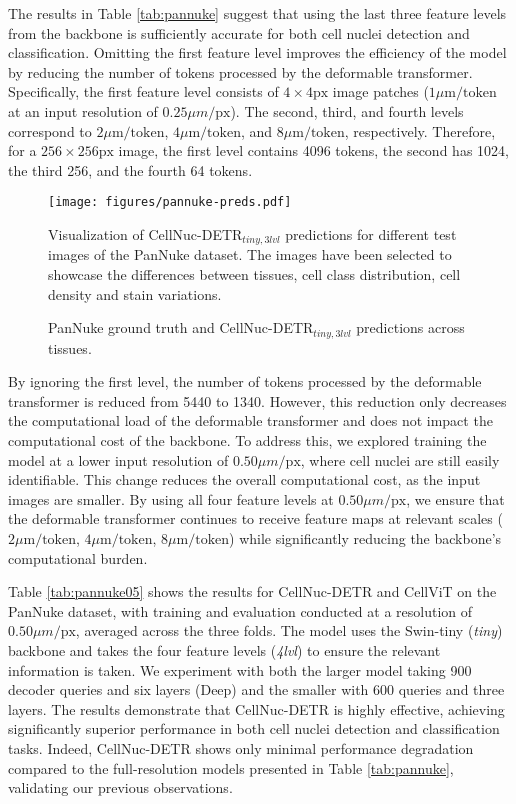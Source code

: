 The results in Table \ref{tab:pannuke} suggest that using the last three feature levels from the backbone is sufficiently accurate for both cell nuclei detection and classification. Omitting the first feature level improves the efficiency of the model by reducing the number of tokens processed by the deformable transformer. Specifically, the first feature level consists of $4\times4\text{px}$ image patches ($1 \mu \text{m}/\text{token}$ at an input resolution of $0.25 \mu m/\text{px}$). The second, third, and fourth levels correspond to $2 \mu \text{m}/\text{token}$, $4 \mu \text{m}/\text{token}$, and $8 \mu \text{m}/\text{token}$, respectively. Therefore, for a $256\times256\text{px}$ image, the first level contains 4096 tokens, the second has 1024, the third 256, and the fourth 64 tokens.

\begin{figure}
    \centering
    \texttt{[image: figures/pannuke-preds.pdf]}
    \caption{PanNuke ground truth and CellNuc-DETR$_{tiny,3lvl}$ predictions across tissues.}
    \label{fig:results:pannuke}
    \footnotesize{Visualization of CellNuc-DETR$_{tiny,3lvl}$ predictions for different test images of the PanNuke dataset. The images have been selected to showcase the differences between tissues, cell class distribution, cell density and stain variations.}
\end{figure}

By ignoring the first level, the number of tokens processed by the deformable transformer is reduced from 5440 to 1340. However, this reduction only decreases the computational load of the deformable transformer and does not impact the computational cost of the backbone. To address this, we explored training the model at a lower input resolution of $0.50 \mu m/\text{px}$, where cell nuclei are still easily identifiable. This change reduces the overall computational cost, as the input images are smaller. By using all four feature levels at $0.50 \mu m/\text{px}$, we ensure that the deformable transformer continues to receive feature maps at relevant scales ($2 \mu \text{m}/\text{token}$, $4 \mu \text{m}/\text{token}$, $8 \mu \text{m}/\text{token}$) while significantly reducing the backbone's computational burden.

Table \ref{tab:pannuke05} shows the results for CellNuc-DETR and CellViT on the PanNuke dataset, with training and evaluation conducted at a resolution of $0.50 \mu m/\text{px}$, averaged across the three folds. The model uses the Swin-tiny (\textit{tiny}) backbone and takes the four feature levels (\textit{4lvl}) to ensure the relevant information is taken. We experiment with both the larger model taking 900 decoder queries and six layers (Deep) and the smaller with 600 queries and three layers. The results demonstrate that CellNuc-DETR is highly effective, achieving significantly superior performance in both cell nuclei detection and classification tasks. Indeed, CellNuc-DETR shows only minimal performance degradation compared to the full-resolution models presented in Table \ref{tab:pannuke}, validating our previous observations.

